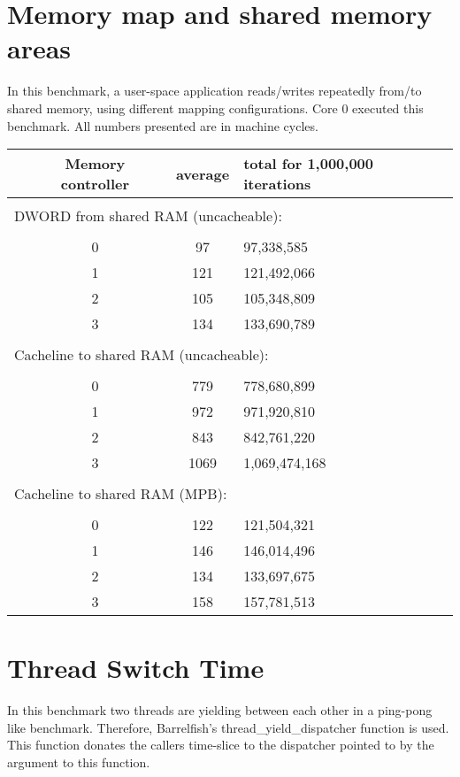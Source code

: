 \documentclass[a4paper,twoside]{report} %
\begin{document}
\section{Memory map and shared memory areas}

In this benchmark, a user-space application reads/writes repeatedly
from/to shared memory, using different mapping configurations. Core 0
executed this benchmark. All numbers presented are in machine cycles.

\begin{center}
\begin{tabular}{cccl}
\hspace{3em} & Memory controller & average & total for 1,000,000 iterations \\
\hline \\
\multicolumn{4}{l}{DWORD from shared RAM (uncacheable):} \\
\\
 & 0 & 97  & 97,338,585 \\
 & 1 & 121 & 121,492,066 \\
 & 2 & 105 & 105,348,809 \\
 & 3 & 134 & 133,690,789 \\
\\
\multicolumn{4}{l}{Cacheline to shared RAM (uncacheable):} \\
\\
 & 0 & 779 & 778,680,899 \\
 & 1 & 972 & 971,920,810 \\
 & 2 & 843 & 842,761,220 \\
 & 3 & 1069 & 1,069,474,168 \\
\\
\multicolumn{4}{l}{Cacheline to shared RAM (MPB):} \\
\\
 & 0 & 122 & 121,504,321 \\
 & 1 & 146 & 146,014,496 \\
 & 2 & 134 & 133,697,675 \\
 & 3 & 158 & 157,781,513 \\
\end{tabular}
\end{center}

\section{Thread Switch Time}

In this benchmark two threads are yielding between each  other in a
ping-pong like benchmark. Therefore, Barrelfish's
thread\_yield\_dispatcher function is used. This function donates the
callers time-slice to the dispatcher pointed to by the argument to this
function.
\end{document}
